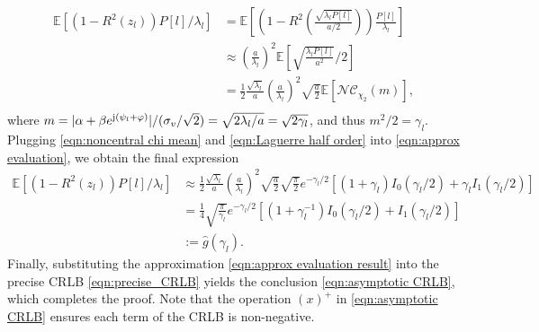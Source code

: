 \documentclass[12pt,draftclsnofoot,journal,onecolumn]{IEEEtran}
\theoremstyle{nonumberplain}
\def \nc {\mathcal{NC}}
\begin{document}
    \begin{equation}
        \begin{aligned}
        \mathbb{E}[(1-R^2(z_l))P[l]/\lambda_l] & = \mathbb{E}\left[\left(1-R^2\left(\frac{\sqrt{\lambda_l P[l]}}{a/2}\right)\right)\frac{P[l]}{\lambda_l}\right] \\
        & \approx \left(\frac{a}{\lambda_l}\right)^2 \mathbb{E}\left[ \sqrt{\frac{\lambda_l P[l]}{a^2}}/2 \right]\\
        & = \frac{1}{2}\frac{\sqrt{\lambda_l}}{a}\left(\frac{a}{\lambda_l}\right)^2 \sqrt{\frac{a}{2}}\mathbb{E}\left[\nc_{\chi_2}(m)\right],\\
        \end{aligned}
        \label{eqn:approx evaluation}
    \end{equation}
    where $m=\lvert\alpha + \beta e^{{\rm j} (\psi_l + \varphi)}\rvert/(\sigma_v / \sqrt{2}) = \sqrt{2\lambda_l/a} = \sqrt{2\gamma_l}$, and thus $m^2/2=\gamma_l$. Plugging \eqref{eqn:noncentral chi mean} and \eqref{eqn:Laguerre half order} into \eqref{eqn:approx evaluation}, we obtain the final expression 
    \begin{equation}
        \begin{aligned}
        \mathbb{E}[(1-R^2(z_l))P[l]/\lambda_l] & \approx \frac{1}{2}\frac{\sqrt{\lambda_l}}{a}\left(\frac{a}{\lambda_l}\right)^2 \sqrt{\frac{a}{2}} \sqrt{\frac{\pi}{2}} e^{-\gamma_l/2}\left[(1+\gamma_l)I_0(\gamma_l/2)+\gamma_l I_1(\gamma_l/2)\right] \\
        & = \frac{1}{4}\sqrt{\frac{\pi}{\gamma_l}}e^{-\gamma_l/2}\left[(1+\gamma_l^{-1})I_0(\gamma_l/2)+ I_1(\gamma_l/2)\right] \\
        & := \hat{g}(\gamma_l).
        \end{aligned}
        \label{eqn:approx evaluation result}
    \end{equation}
    Finally, substituting the approximation \eqref{eqn:approx evaluation result} into the precise CRLB \eqref{eqn:precise_CRLB} yields the conclusion \eqref{eqn:asymptotic CRLB}, which completes the proof. Note that the operation $(x)^+$ in \eqref{eqn:asymptotic CRLB} ensures each term of the CRLB is non-negative. 
\end{document}
